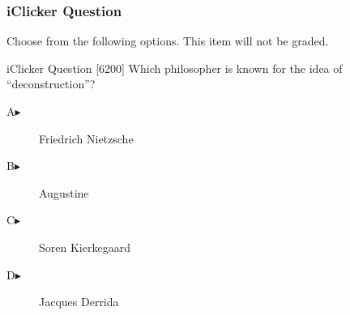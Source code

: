 \begin{frame}
  \frametitle{iClicker Question}
Choose from the following options. This item will not be graded.
\begin{block}{iClicker Question}
[6200] Which philosopher is known for the idea of ``deconstruction''?
\end{block}
\begin{description}
\item[A\hspace{.2in}$\blacktriangleright$] Friedrich Nietzsche
\item[B\hspace{.2in}$\blacktriangleright$] Augustine
\item[C\hspace{.2in}$\blacktriangleright$] S{\/o}ren Kierkegaard
\item[D\hspace{.2in}$\blacktriangleright$] Jacques Derrida
\end{description}
\end{frame}
